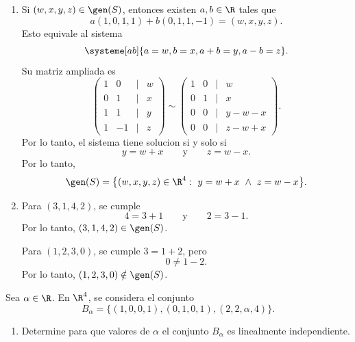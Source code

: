 \documentclass[11pt,respuestas,a4]{aleph-examen}
\begin{document}
\begin{preguntas}
\begin{respuesta}\hspace{0pt}
\begin{enumerate}
\item
    Si $(w,x,y,z)\in\gen(S)$, entonces existen $a,b\in\R$ tales que
    \[
        a(1,0,1,1)+b(0,1,1,-1)=(w,x,y,z).
    \]
    Esto equivale al sistema
    \[
        \systeme[ab]{
            a=w,
            b=x,
            a+b=y,
            a-b=z
        }.
    \]
    Su matriz ampliada es
    \[
        \begin{pmatrix}
            1 & 0 & | & w\\
            0 & 1 & | & x\\
            1 & 1 & | & y\\
            1 & -1 & | & z
        \end{pmatrix}
        \sim
        \begin{pmatrix}
            1 & 0 & | & w\\
            0 & 1 & | & x\\
            0 & 0 & | & y-w-x\\
            0 & 0 & | & z-w+x
        \end{pmatrix}.
    \]
    Por lo tanto, el sistema tiene solucion si y solo si
    \[
        y=w+x
        \qquad\text{y}\qquad
        z=w-x.
    \]
    Por lo tanto,
    \[
        \gen(S)=
        \big\{(w,x,y,z)\in\R^4:\ y=w+x\ \land\ z=w-x\big\}.
    \]
\item
    Para $(3,1,4,2)$, se cumple
    \[
        4=3+1
        \qquad\text{y}\qquad
        2=3-1.
    \]
    Por lo tanto, $(3,1,4,2)\in\gen(S)$.

    Para $(1,2,3,0)$, se cumple $3=1+2$, pero
    \[
        0\neq 1-2.
    \]
    Por lo tanto, $(1,2,3,0)\notin\gen(S)$.\qedhere
\end{enumerate}
\end{respuesta}

\item
    Sea $\alpha\in\R$. En $\R^4$, se considera el conjunto
    \[
        B_\alpha=\big\{
            (1,0,0,1),
            (0,1,0,1),
            (2,2,\alpha,4)
        \big\}.
    \]
    \begin{enumerate}
    \item
        Determine para que valores de $\alpha$ el conjunto $B_\alpha$ es linealmente independiente.
    \end{enumerate}


\end{preguntas}
\end{document}
